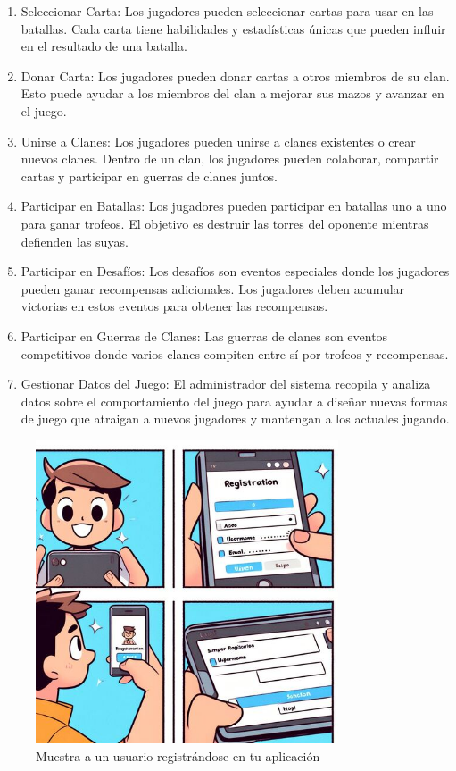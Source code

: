 \begin{enumerate}
  \item Seleccionar Carta: Los jugadores pueden seleccionar cartas para usar en las batallas. Cada carta tiene habilidades y estadísticas únicas que pueden influir en el resultado de una batalla.
  \item Donar Carta: Los jugadores pueden donar cartas a otros miembros de su clan. Esto puede ayudar a los miembros del clan a mejorar sus mazos y avanzar en el juego.
  \item Unirse a Clanes: Los jugadores pueden unirse a clanes existentes o crear nuevos clanes. Dentro de un clan, los jugadores pueden colaborar, compartir cartas y participar en guerras de clanes juntos.
  \item Participar en Batallas: Los jugadores pueden participar en batallas uno a uno para ganar trofeos. El objetivo es destruir las torres del oponente mientras defienden las suyas.
  \item Participar en Desafíos: Los desafíos son eventos especiales donde los jugadores pueden ganar recompensas adicionales. Los jugadores deben acumular victorias en estos eventos para obtener las recompensas.
  \item Participar en Guerras de Clanes: Las guerras de clanes son eventos competitivos donde varios clanes compiten entre sí por trofeos y recompensas.
  \item Gestionar Datos del Juego: El administrador del sistema recopila y analiza datos sobre el comportamiento del juego para ayudar a diseñar nuevas formas de juego que atraigan a nuevos jugadores y mantengan a los actuales jugando.
\end{enumerate}

\begin{figure}[H]
  \centering
  \includegraphics[width=0.8\textwidth]{../images/comic_registration.jpeg}
  \caption{Muestra a un  usuario registrándose en tu aplicación}
\end{figure}

